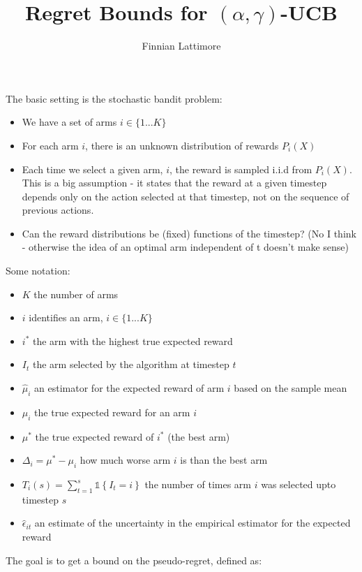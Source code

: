 \documentclass{article}
\title{Regret Bounds for $(\alpha,\gamma)$-UCB}
\author{Finnian Lattimore}
\newcommand{\set}[1]{\left\{#1\right\}}
\newcommand{\ind}[1]{\mathds{1}\!\!\set{#1}}
\theoremstyle{plain}
\theoremstyle{definition}
\begin{document}
\def\ci{\perp\!\!\!\perp}
\maketitle

The basic setting is the stochastic bandit problem: 

\begin{itemize}
\item We have a set of arms $i \in \{1...K\}$
\item For each arm $i$, there is an unknown distribution of rewards $P_{i}(X)$
\item Each time we select a given arm, $i$, the reward is sampled i.i.d from $P_{i}(X)$. This is a big assumption - it states that the reward at a given timestep depends only on the action selected at that timestep, not on the sequence of previous actions. 
\item \color{red}Can the reward distributions be (fixed) functions of the timestep? (No I think - otherwise the idea of an optimal arm independent of t doesn't make sense)
\end{itemize}

Some notation:

\begin{itemize}
\item $K$ the number of arms
\item $i$ identifies an arm, $i \in \{1...K\}$
\item $i^*$ the arm with the highest true expected reward
\item $I_t$ the arm selected by the algorithm at timestep $t$
\item $\hat{\mu}_i$ an estimator for the expected reward of arm $i$ based on the sample mean
\item $\mu_i$ the true expected reward for an arm $i$
\item $\mu^*$ the true expected reward of  $i^*$ (the best arm)
\item $\Delta_i = \mu^* - \mu_i$ how much worse arm $i$ is than the best arm
\item $T_i(s) = \sum_{t=1}^s \ind{I_t = i}$ the number of times arm $i$ was selected upto timestep $s$
\item $\hat \epsilon_{it}$ an estimate of the uncertainty in the empirical estimator for the expected reward


\end{itemize}

The goal is to get a bound on the pseudo-regret, defined as:
\end{document}
